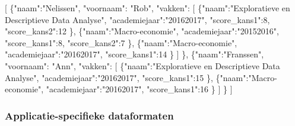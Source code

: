 \documentclass[]{tufte-book}
\newenvironment{Shaded}{}{}
\newcommand{\DataTypeTok}[1]{\textcolor[rgb]{0.56,0.13,0.00}{#1}}
\newcommand{\DecValTok}[1]{\textcolor[rgb]{0.25,0.63,0.44}{#1}}
\newcommand{\FunctionTok}[1]{\textcolor[rgb]{0.02,0.16,0.49}{#1}}
\newcommand{\OtherTok}[1]{\textcolor[rgb]{0.00,0.44,0.13}{#1}}
\newcommand{\StringTok}[1]{\textcolor[rgb]{0.25,0.44,0.63}{#1}}
\begin{document}
\begin{Shaded}
\begin{Highlighting}[]
\OtherTok{[}
  \FunctionTok{\{}\DataTypeTok{"naam"}\FunctionTok{:}\StringTok{"Nelissen"}\FunctionTok{,}
   \DataTypeTok{"voornaam"}\FunctionTok{:} \StringTok{"Rob"}\FunctionTok{,}
   \DataTypeTok{"vakken"}\FunctionTok{:} 
    \OtherTok{[}
      \FunctionTok{\{}\DataTypeTok{"naam"}\FunctionTok{:}\StringTok{"Exploratieve en Descriptieve Data Analyse"}\FunctionTok{,}
       \DataTypeTok{"academiejaar"}\FunctionTok{:}\StringTok{"20162017"}\FunctionTok{,}
       \DataTypeTok{"score_kans1"}\FunctionTok{:}\DecValTok{8}\FunctionTok{,}
       \DataTypeTok{"score_kans2"}\FunctionTok{:}\DecValTok{12}
      \FunctionTok{\}}\OtherTok{,}
      \FunctionTok{\{}\DataTypeTok{"naam"}\FunctionTok{:}\StringTok{"Macro-economie"}\FunctionTok{,}
       \DataTypeTok{"academiejaar"}\FunctionTok{:}\StringTok{"20152016"}\FunctionTok{,}
       \DataTypeTok{"score_kans1"}\FunctionTok{:}\DecValTok{8}\FunctionTok{,}
       \DataTypeTok{"score_kans2"}\FunctionTok{:}\DecValTok{7}
      \FunctionTok{\}}\OtherTok{,}
      \FunctionTok{\{}\DataTypeTok{"naam"}\FunctionTok{:}\StringTok{"Macro-economie"}\FunctionTok{,}
       \DataTypeTok{"academiejaar"}\FunctionTok{:}\StringTok{"20162017"}\FunctionTok{,}
       \DataTypeTok{"score_kans1"}\FunctionTok{:}\DecValTok{14}
      \FunctionTok{\}}
    \OtherTok{]}
  \FunctionTok{\}}\OtherTok{,}
  \FunctionTok{\{}\DataTypeTok{"naam"}\FunctionTok{:}\StringTok{"Franssen"}\FunctionTok{,}
   \DataTypeTok{"voornaam"}\FunctionTok{:} \StringTok{"Ann"}\FunctionTok{,}
   \DataTypeTok{"vakken"}\FunctionTok{:} 
    \OtherTok{[}
      \FunctionTok{\{}\DataTypeTok{"naam"}\FunctionTok{:}\StringTok{"Exploratieve en Descriptieve Data Analyse"}\FunctionTok{,}
       \DataTypeTok{"academiejaar"}\FunctionTok{:}\StringTok{"20162017"}\FunctionTok{,}
       \DataTypeTok{"score_kans1"}\FunctionTok{:}\DecValTok{15}
      \FunctionTok{\}}\OtherTok{,}
      \FunctionTok{\{}\DataTypeTok{"naam"}\FunctionTok{:}\StringTok{"Macro-economie"}\FunctionTok{,}
       \DataTypeTok{"academiejaar"}\FunctionTok{:}\StringTok{"20162017"}\FunctionTok{,}
       \DataTypeTok{"score_kans1"}\FunctionTok{:}\DecValTok{16}
      \FunctionTok{\}}
    \OtherTok{]}
  \FunctionTok{\}}
\OtherTok{]}
\end{Highlighting}
\end{Shaded}

\hypertarget{applicatie-specifieke-dataformaten}{%
\subsubsection{Applicatie-specifieke dataformaten}\label{applicatie-specifieke-dataformaten}}
\end{document}
